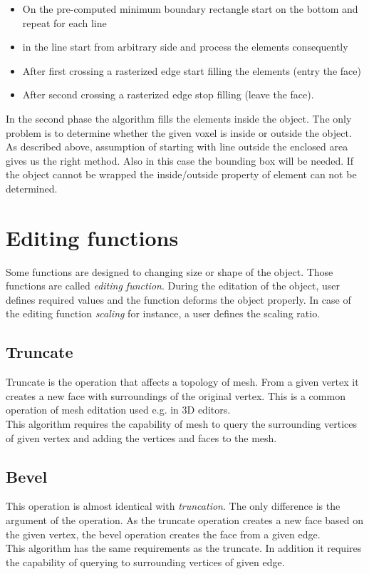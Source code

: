 \begin{itemize}
\item On the pre-computed minimum boundary rectangle start on the bottom and repeat for each line
\item in the line start from arbitrary side and process the elements consequently
\item After first crossing a rasterized edge start filling the elements (entry the face)
\item After second crossing a rasterized edge stop filling (leave the face).

\end{itemize}

In the second phase the algorithm fills the elements inside the object. The only problem is to
determine whether the given voxel is inside or outside the object. As described above, assumption of
starting with line outside the enclosed area gives us the right method. Also in this case the
bounding box will be needed. If the object cannot be wrapped the inside/outside property of element can 
not be determined.

\section{Editing functions}

Some functions are designed to changing size or shape of the object. Those functions are called 
\emph{editing function}.
During the editation of the object, user defines required values and the function deforms the
object properly. In case of the editing function \emph{scaling} for instance, a user defines the scaling
ratio.

\subsection{Truncate}

Truncate is the operation that affects a topology of mesh. From a given vertex it creates a new face with
surroundings of the original vertex. This is a common operation of mesh editation used e.g. in
3D editors.\\

This algorithm requires the capability of mesh to query the surrounding vertices of given vertex and
adding the vertices and faces to the mesh.

\subsection{Bevel}

This operation is almost identical with \emph{truncation}. The only difference is the argument of the
operation. As the truncate operation creates a new face based on the given vertex, the bevel operation
creates the face from a given edge.\\

This algorithm has the same requirements as the truncate. In addition it requires the capability of
querying to surrounding vertices of given edge.